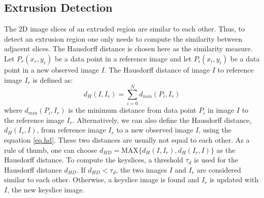 \documentclass{llncs}
\begin{document}
\subsection{Extrusion Detection}
\label{sec_ksd}
The 2D image slices of an extruded region are similar to each other.
Thus, to detect an extrusion region one only needs to compute
the similarity between adjacent slices.
The Hausdorff distance is chosen here as the similarity measure.
Let $P_r(x_r, y_r)$ be a data point in a reference image and
let $P_i(x_i, y_i)$ be a data point in a new observed image $I$.
The Hausdorff distance of image $I$ to reference image $I_r$ is defined as:
\begin{equation} \label{eq.hd}
d_H(I, I_r) = \sum_{i=0}^Nd_{min}(P_i, I_r)
\end{equation}
where $d_{min}(P_i, I_r)$ is the minimum distance from data point $P_i$
in image $I$ to the reference image $I_r$.
Alternatively, we can also define the Hausdorff distance, $d_H(I_r, I)$,
from reference image $I_r$ to a new observed image $I$, using the equation \ref{eq.hd}.
These two distances are usually not equal to each other.
As a rule of thumb, one can choose
$d_{HD} = \text{MAX}\{d_H(I, I_r), d_H(I_r, I)\}$ as the Hausdorff distance.
To compute the keyslices, a threshold $\tau_{d}$ is used for the
Hausdorff distance $d_{HD}$.
If $d_{HD} < \tau_{d}$, the two images $I$ and $I_r$ are considered
similar to each other.
Otherwise, a keyslice image is found and $I_r$ is updated with $I$,
the new keyslice image.
\end{document}
